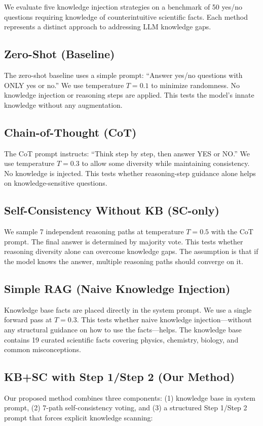 We evaluate five knowledge injection strategies on a benchmark of 50 yes/no questions requiring knowledge of counterintuitive scientific facts. Each method represents a distinct approach to addressing LLM knowledge gaps.

\subsection{Zero-Shot (Baseline)}
The zero-shot baseline uses a simple prompt: ``Answer yes/no questions with ONLY yes or no.'' We use temperature $T=0.1$ to minimize randomness. No knowledge injection or reasoning steps are applied. This tests the model's innate knowledge without any augmentation.

\subsection{Chain-of-Thought (CoT)}
The CoT prompt instructs: ``Think step by step, then answer YES or NO.'' We use temperature $T=0.3$ to allow some diversity while maintaining consistency. No knowledge is injected. This tests whether reasoning-step guidance alone helps on knowledge-sensitive questions.

\subsection{Self-Consistency Without KB (SC-only)}
We sample 7 independent reasoning paths at temperature $T=0.5$ with the CoT prompt. The final answer is determined by majority vote. This tests whether reasoning diversity alone can overcome knowledge gaps. The assumption is that if the model knows the answer, multiple reasoning paths should converge on it.

\subsection{Simple RAG (Naive Knowledge Injection)}
Knowledge base facts are placed directly in the system prompt. We use a single forward pass at $T=0.3$. This tests whether naive knowledge injection---without any structural guidance on how to use the facts---helps. The knowledge base contains 19 curated scientific facts covering physics, chemistry, biology, and common misconceptions.

\subsection{KB+SC with Step 1/Step 2 (Our Method)}
Our proposed method combines three components: (1) knowledge base in system prompt, (2) 7-path self-consistency voting, and (3) a structured Step 1/Step 2 prompt that forces explicit knowledge scanning:

